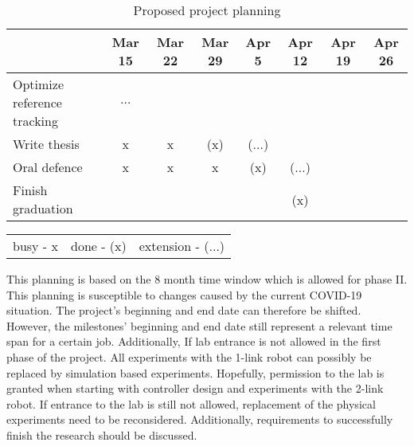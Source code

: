 \begin{table}[H]
\begin{tabular}{p{5cm}ccccccc}
                               & Mar 15 & Mar 22 & Mar 29 & Apr 5  & Apr 12 & Apr 19 & Apr 26 \\ \hline
    Optimize reference tracking     & $\dots$    &           &          &       &   &        &   \\ 
    Write thesis               & x   &    x     &   (x)   & ($\dots$)  &        &        &          \\ 
    Oral defence               &  x    &    x   &   x        & (x)   & ($\dots$)    &        &           \\    
    Finish graduation          &      &        &         &           &   (x)     &        &      \\    \hline 

 
    \end{tabular}
    \caption{Proposed project planning}
    \label{tab1:projectplanning}
\end{table}

\begin{table}[H]
    \centering
    \begin{tabular}{ccc}
       busy - x & done - (x) & extension - ($\dots$)
    \end{tabular}
\end{table}


This planning is based on the 8 month time window which is allowed for phase II. This planning is susceptible to changes caused by the current COVID-19 situation. The project's beginning and end date can therefore be shifted. However, the milestones' beginning and end date still represent a relevant time span for a certain job. Additionally, If lab entrance is not allowed in the first phase of the project. All experiments with the 1-link robot can possibly be replaced by simulation based experiments. Hopefully, permission to the lab is granted when starting with controller design and experiments with the 2-link robot. If entrance to the lab is still not allowed, replacement of the physical experiments need to be reconsidered. Additionally, requirements to successfully finish the research should be discussed. 
